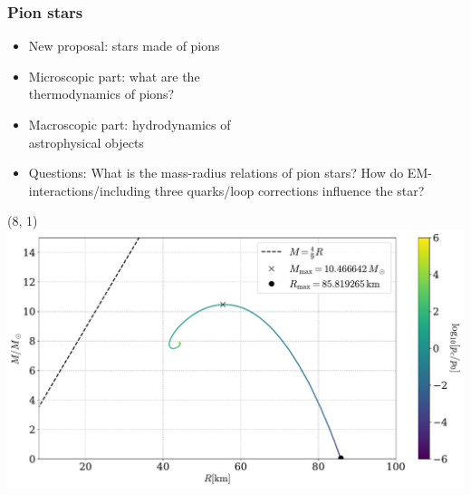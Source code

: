 \documentclass[aspectratio=169]{beamer}
\author{Martin Johnsrud}
\begin{document}

    \begin{frame}
        \frametitle{Pion stars}
        \begin{itemize}
            \itemsep 0.4cm
            \item New proposal: stars made of pions
            \item Microscopic part: what are the\\ thermodynamics of pions?
            \item Macroscopic part: hydrodynamics of\\
             astrophysical objects
            \item Questions: What is the mass-radius relations of pion stars?
            How do EM-interactions/including three quarks/loop corrections influence the star?
        \end{itemize}

        \begin{textblock}{8}(8, 1)
            \includegraphics[width=\textwidth]{../../scripts/figurer/pion_star/mass_radius_pion_star.pdf}
        \end{textblock}


    \end{frame}
\end{document}

